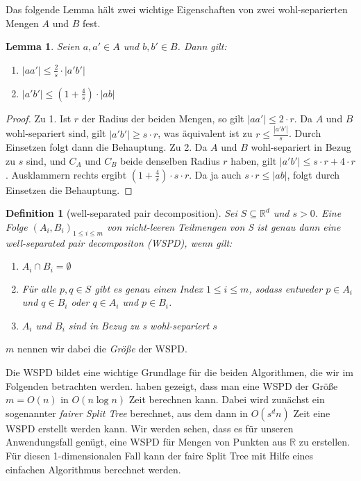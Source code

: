 \documentclass[11pt]{article}
\newcommand{\R}{\mathbb{R}}
\newtheorem{lemma}[theorem]{Lemma}
\newtheorem{definition}[theorem]{Definition}
\begin{document}
    Das folgende Lemma hält zwei wichtige Eigenschaften von zwei wohl-separierten Mengen $A$ und $B$ fest.
    \begin{lemma}
		Seien $a, a' \in A$ und $b, b' \in B$. Dann gilt:
		\begin{enumerate}
			\item $\displaystyle |aa'| \leq \frac{2}{s}\cdot|a'b'|$
			\item $\displaystyle |a'b'| \leq (1+\frac{4}{s})\cdot|ab|$
		\end{enumerate}
    \end{lemma}
    \begin{proof}
    	Zu 1. Ist $r$ der Radius der beiden Mengen, so gilt $|aa'| \leq 2 \cdot r$. Da $A$ und $B$ wohl-separiert sind, gilt $|a'b'| \geq s \cdot r$, was äquivalent ist zu $r \leq \frac{|a'b'|}{s}$. Durch Einsetzen folgt dann die Behauptung.
    	Zu 2. Da $A$ und $B$ wohl-separiert in Bezug zu $s$ sind, und $C_A$ und $C_B$ beide denselben Radius $r$ haben, gilt $|a'b'| \leq s \cdot r + 4 \cdot r$. Ausklammern rechts ergibt $(1 + \frac{4}{s}) \cdot s \cdot r$. Da ja auch $s \cdot r \leq |ab|$, folgt durch Einsetzen die Behauptung.
    \end{proof}
    
    \begin{definition}[well-separated pair decomposition]
    	\label{def:wspd}
    	Sei $S \subseteq \R^d$ und $s > 0$. Eine Folge $(A_i, B_i)_{1 \leq i \leq m}$ von nicht-leeren Teilmengen von S ist genau dann eine \emph{well-separated pair decompositon (WSPD)}, wenn gilt:
    	\begin{enumerate}[label={(\arabic*)}, itemsep=0mm]
    		\item $A_i \cap B_i = \emptyset$
    		\item Für alle $p, q \in S$ gibt es genau einen Index $1 \leq i \leq m$, sodass entweder $p \in A_i$ und $q \in B_i$ oder $q \in A_i$ und $p \in B_i$.
    		\item $A_i$ und $B_i$ sind in Bezug zu s wohl-separiert $s$
    	\end{enumerate}
    \end{definition}
	
	\noindent	$m$ nennen wir dabei die \emph{Größe} der WSPD.

	Die WSPD bildet eine wichtige Grundlage für die beiden Algorithmen, die wir im Folgenden betrachten werden. \textellipsis haben gezeigt, dass man eine WSPD der Größe $m = O(n)$ in $O(n\log n)$ Zeit berechnen kann. Dabei wird zunächst ein sogenannter \emph{fairer Split Tree} berechnet, aus dem dann in $O(s^dn)$ Zeit eine WSPD erstellt werden kann. Wir werden sehen, dass es für unseren Anwendungsfall genügt, eine WSPD für Mengen von Punkten aus $\R$ zu erstellen. Für diesen 1-dimensionalen Fall kann der faire Split Tree mit Hilfe eines einfachen Algorithmus berechnet werden.
	
\end{document}
